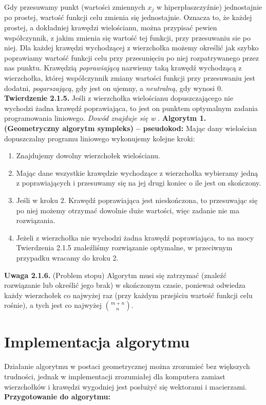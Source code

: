 \documentclass[licencjacka]{pracamgr}
\begin{document}
Gdy przesuwamy punkt (wartości zmiennych $x_j$ w hiperpłaszczyźnie) jednostajnie po prostej, wartość funkcji celu zmienia się jednostajnie.
Oznacza to, że każdej prostej, a dokładniej krawędzi wielościanu, można przypisać pewien współczynnik, z jakim zmienia się wartość tej funkcji, przy przesuwaniu sie po niej.
Dla każdej krawędzi wychodzącej z wierzchołka możemy określić jak szybko poprawiamy wartość funkcji celu przy przesunięciu po niej rozpatrywanego przez nas punktu.
Krawędzią \emph{poprawiającą} nazwiemy taką krawędź wychodzącą z wierzchołka, której współczynnik zmiany wartości funkcji przy przesuwaniu jest dodatni,
\emph{pogarszającą}, gdy jest on ujemny, a \emph{neutralną}, gdy wynosi $0$.\newline\newline
%
\textbf{Twierdzenie 2.1.5.} Jeśli z wierzchołka wielościanu dopuszczającego nie wychodzi żadna krawędź poprawiająca, to jest on punktem optymalnym zadania programowania liniowego.\newline\newline
\textit{Dowód znajduje się w} \cite[tw. 4.3]{OPT}.\newline\newline
\textbf{Algorytm 1. (Geometryczny algorytm sympleks) -- pseudokod:}\newline
Mając dany wielościan dopuszczalny programu liniowego wykonujemy kolejne kroki:
\begin{enumerate}
\item Znajdujemy dowolny wierzchołek wielościanu.
\item Mając dane wszystkie krawędzie wychodzące z wierzchołka wybieramy jedną z poprawiających i przesuwamy się na jej drugi koniec o ile jest on skończony.
\item Jeśli w kroku 2. Krawędź poprawiająca jest nieskończona, to przesuwając się po niej możemy otrzymać dowolnie duże wartości, więc zadanie nie ma rozwiązania.
\item Jeżeli z wierzchołka nie wychodzi żadna krawędź poprawiająca, to na mocy Twierdzenia 2.1.5 znaleźliśmy rozwiązanie optymalne, w przeciwnym przypadku wracamy do kroku 2.
\end{enumerate}
%
\textbf{Uwaga 2.1.6.} (Problem stopu) Algorytm musi się zatrzymać (znaleźć rozwiązanie lub określić jego brak) w skończonym czasie, ponieważ odwiedza każdy wierzchołek co najwyżej raz
(przy każdym przejściu wartość funkcji celu rośnie), a tych jest co najwyżej ${m+n\choose n}$.\newpage
%
  \section{Implementacja algorytmu}
Działanie algorytmu w postaci geometrycznej można zrozumieć bez większych trudności,
jednak w implementacji zrozumiałej dla komputera zamiast wierzchołków i krawędzi wygodniej jest posłużyć się wektorami i macierzami.\newline\newline
%
\textbf{Przygotowanie do algorytmu:}
\end{document}
